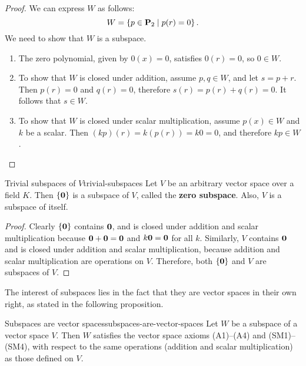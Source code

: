 \begin{proof}
  We can express $W$ as follows:
  \begin{equation*}
    W = \left\{p\in\mathbf{P}_2 \mid p(r)  = 0\right\}.
  \end{equation*}
  We need to show that $W$ is a subspace.
  \begin{enumerate}
  \item The zero polynomial, given by $0(x)=0$, satisfies $0(r)=0$, so
    $0\in W$.
  \item To show that $W$ is closed under addition, assume
    $p, q\in W$, and let $s=p+r$. Then $p(r)=0$ and $q(r)=0$,
    therefore $s(r) = p(r)+q(r) = 0$. It follows that $s\in W$.
  \item To show that $W$ is closed under scalar multiplication, assume
    $p(x)\in W$ and $k$ be a scalar. Then $(kp)(r)=k(p(r))=k0=0$, and
    therefore $kp\in W$.
  \end{enumerate}
\end{proof}

\begin{example}{Trivial subspaces of\/ $V$}{trivial-subspaces}
  Let $V$ be an arbitrary vector space over a field $K$. Then
  $\left\{\mbox{\bf 0}\right\}$ is a subspace of\/ $V$, called the \textbf{zero
    subspace}. Also, $V$ is a subspace of itself.
\end{example}

\begin{proof}
  Clearly $\left\{\mbox{\bf 0}\right\}$ contains $\mbox{\bf 0}$, and is closed under
  addition and scalar multiplication because
  $\mbox{\bf 0}+\mbox{\bf 0}=\mbox{\bf 0}$ and $k\mbox{\bf 0}=\mbox{\bf 0}$ for all $k$.
  Similarly, $V$ contains $\mbox{\bf 0}$ and is closed under addition and
  scalar multiplication, because addition and scalar multiplication
  are operations on $V$.  Therefore, both $\left\{\mbox{\bf 0}\right\}$ and $V$ are
  subspaces of\/ $V$.
\end{proof}

The interest of subspaces lies in the fact that they are vector spaces
in their own right, as stated in the following proposition.

\begin{proposition}{Subspaces are vector spaces}{subspaces-are-vector-spaces}
  Let $W$ be a subspace of a vector space $V$. Then $W$ satisfies the
  vector space axioms (A1)--(A4) and (SM1)--(SM4), with respect to the
  same operations (addition and scalar multiplication) as those
  defined on $V$.
\end{proposition}

